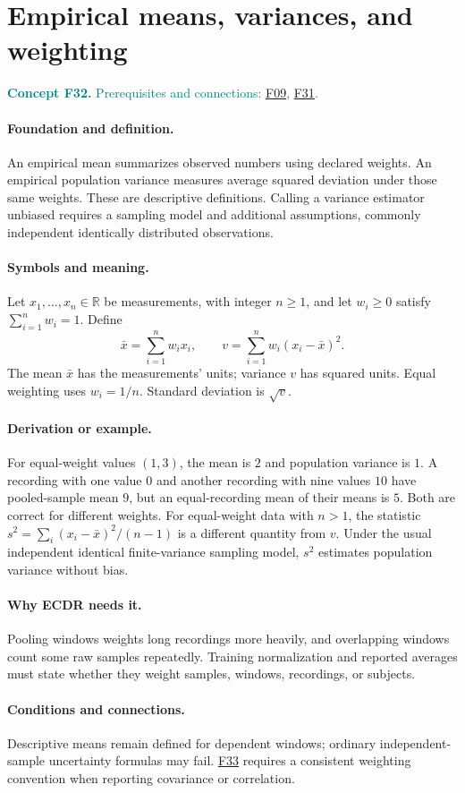 \documentclass[11pt,a4paper]{article}
\newcommand{\R}{\mathbb R}
\newcommand{\conceptid}{Front matter}
\newcommand{\concept}[3]{\clearpage\renewcommand{\conceptid}{#1}%
\section{#2}\label{concept:#1}%
\textcolor{teal}{\textbf{Concept #1.} Prerequisites and connections: #3.}\par
\typeout{ECDR-CONCEPT-START #1 PAGE=\thepage}}
\begin{document}
\concept{F32}{Empirical means, variances, and weighting}{\hyperref[concept:F09]{F09}, \hyperref[concept:F31]{F31}}
\paragraph{Foundation and definition.}
An empirical mean summarizes observed numbers using declared weights.
An empirical population variance measures average squared deviation
under those same weights. These are descriptive definitions. Calling a
variance estimator unbiased requires a sampling model and additional
assumptions, commonly independent identically distributed observations.
\paragraph{Symbols and meaning.}
Let $x_1,\ldots,x_n\in\R$ be measurements, with integer $n\ge1$,
and let $w_i\ge0$ satisfy $\sum_{i=1}^{n}w_i=1$. Define
\[
 \bar x=\sum_{i=1}^{n}w_i x_i,
 \qquad v=\sum_{i=1}^{n}w_i(x_i-\bar x)^2.
\]
The mean $\bar x$ has the measurements' units; variance $v$ has squared
units. Equal weighting uses $w_i=1/n$. Standard deviation is $\sqrt v$.
\paragraph{Derivation or example.}
For equal-weight values $(1,3)$, the mean is $2$ and population
variance is $1$. A recording with one value $0$ and another recording
with nine values $10$ have pooled-sample mean $9$, but an equal-recording
mean of their means is $5$. Both are correct for different weights.
For equal-weight data with $n>1$, the statistic
$s^2=\sum_i(x_i-\bar x)^2/(n-1)$ is a different quantity from $v$.
Under the usual independent identical finite-variance sampling model,
$s^2$ estimates population variance without bias.
\paragraph{Why ECDR needs it.}
Pooling windows weights long recordings more heavily, and overlapping
windows count some raw samples repeatedly. Training normalization and
reported averages must state whether they weight samples, windows,
recordings, or subjects.
\paragraph{Conditions and connections.}
Descriptive means remain defined for dependent windows; ordinary
independent-sample uncertainty formulas may fail. \hyperref[concept:F33]{F33} requires a
consistent weighting convention when reporting covariance or correlation.
\par\label{endconcept:F32}
\end{document}
